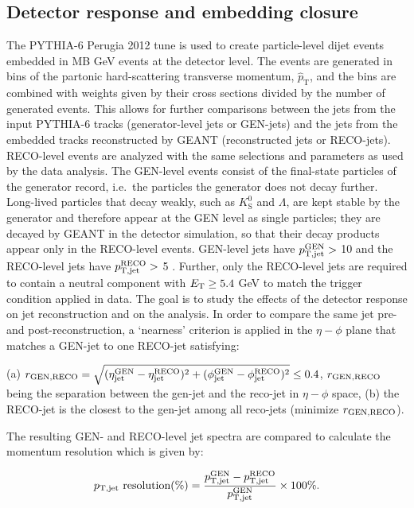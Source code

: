 \subsection{Detector response and embedding closure} \label{sec:AuAuEmbedding}
The PYTHIA\mbox{-}6 Perugia 2012 tune is used to create particle-level dijet events embedded in MB  GeV events at the detector level.
%
The events are generated in bins of the partonic hard-scattering transverse momentum, $\hat{p}_\mathrm{T}$, and the bins are combined with weights given by their cross sections divided by the number of generated events.  This allows for further comparisons between the jets from the input PYTHIA\mbox{-}6 tracks (generator-level jets or GEN-jets) and the jets from the embedded tracks reconstructed by GEANT (reconstructed jets or RECO-jets). RECO-level events are analyzed with the same selections and parameters as used by the data analysis. The GEN-level events consist of the final-state particles of the generator record, i.e.\ the particles the generator does not decay further. Long-lived particles that decay weakly, such as \(K^0_\mathrm{S}\) and \(\Lambda\), are kept stable by the generator and therefore appear at the GEN level as single particles; they are decayed by GEANT in the detector simulation, so that their decay products appear only in the RECO-level events. GEN-level jets have $p_{\mathrm{T, jet}}^{\rm GEN} > $ 10 \GeVc and the RECO-level jets have $p_{\mathrm{T, jet}}^{\rm RECO} >$ 5 \GeVc. Further, only the RECO-level jets are required to contain a neutral component with $ E_{\rm T} \geq 5.4$ GeV to match the trigger condition applied in data. The goal is to study the effects of the detector response on jet reconstruction and on the analysis.  In order to compare the same jet pre- and post-reconstruction, a `nearness' criterion is applied in the $\eta-\phi$ plane that matches a GEN-jet to one RECO-jet satisfying: 

(a) $r_{\rm GEN, RECO}=\sqrt{(\eta^{\rm GEN}_{\rm jet}-\eta^{\rm RECO}_{\rm jet})^2+(\phi^{\rm GEN}_{\rm jet}-\phi^{\rm RECO}_{\rm jet})^2}\leq0.4$, $r_{\rm GEN, RECO}$ being the separation between the gen-jet and the reco-jet in $\eta-\phi$ space, (b) the RECO-jet is the closest to the gen-jet among all reco-jets (minimize $r_{\rm GEN, RECO}$).  

The resulting GEN- and RECO-level jet spectra are compared to calculate the momentum resolution which is given by:

\begin{equation}
	p_{\mathrm{T, jet}} \textnormal{ resolution} (\%) = \frac{\text{\ensuremath{p_{\mathrm{T, jet}}^{\rm GEN}}} - \text{\ensuremath{p_{\mathrm{T, jet}}^{\rm RECO}}}}{\text{\ensuremath{p_{\mathrm{T, jet}}^{\rm GEN}}}} \times \text{100} \%.
	\label{Eq:JetPtRes}
\end{equation}

